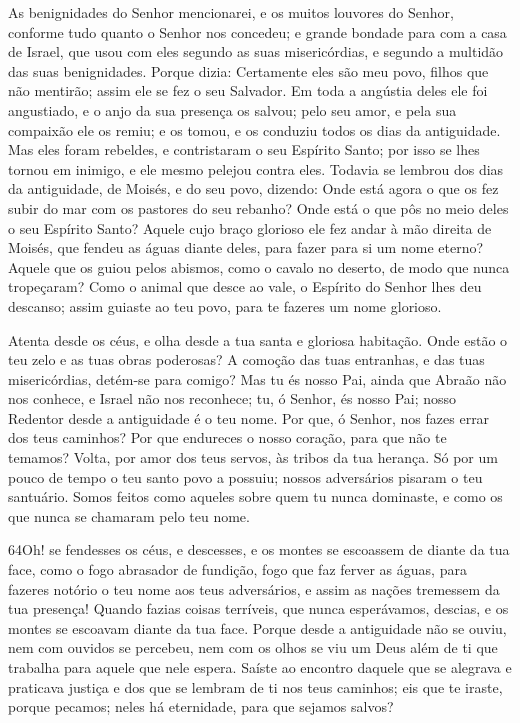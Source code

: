 As benignidades do Senhor mencionarei, e os muitos louvores do
Senhor, conforme tudo quanto o Senhor nos concedeu; e grande bondade
para com a casa de Israel, que usou com eles segundo as suas
misericórdias, e segundo a multidão das suas benignidades.
Porque dizia: Certamente eles são meu povo, filhos que não
mentirão; assim ele se fez o seu Salvador. Em toda a angústia
deles ele foi angustiado, e o anjo da sua presença os salvou; pelo
seu amor, e pela sua compaixão ele os remiu; e os tomou, e os
conduziu todos os dias da antiguidade. Mas eles foram
rebeldes, e contristaram o seu Espírito Santo; por isso se lhes
tornou em inimigo, e ele mesmo pelejou contra eles. Todavia
se lembrou dos dias da antiguidade, de Moisés, e do seu povo,
dizendo: Onde está agora o que os fez subir do mar com os pastores
do seu rebanho? Onde está o que pôs no meio deles o seu Espírito
Santo? Aquele cujo braço glorioso ele fez andar à mão direita
de Moisés, que fendeu as águas diante deles, para fazer para si um
nome eterno? Aquele que os guiou pelos abismos, como o cavalo
no deserto, de modo que nunca tropeçaram? Como o animal que
desce ao vale, o Espírito do Senhor lhes deu descanso; assim guiaste
ao teu povo, para te fazeres um nome glorioso.

Atenta desde os céus, e olha desde a tua santa e gloriosa
habitação. Onde estão o teu zelo e as tuas obras poderosas? A
comoção das tuas entranhas, e das tuas misericórdias, detém-se para
comigo? Mas tu és nosso Pai, ainda que Abraão não nos
conhece, e Israel não nos reconhece; tu, ó Senhor, és nosso Pai;
nosso Redentor desde a antiguidade é o teu nome. Por que, ó
Senhor, nos fazes errar dos teus caminhos? Por que endureces o nosso
coração, para que não te temamos? Volta, por amor dos teus servos,
às tribos da tua herança. Só por um pouco de tempo o teu
santo povo a possuiu; nossos adversários pisaram o teu santuário.
Somos feitos como aqueles sobre quem tu nunca dominaste, e
como os que nunca se chamaram pelo teu nome.

\medskip

\lettrine{64}{}Oh! se fendesses os céus, e descesses, e os
montes se escoassem de diante da tua face, como o fogo abrasador
de fundição, fogo que faz ferver as águas, para fazeres notório o
teu nome aos teus adversários, e assim as nações tremessem da tua
presença! Quando fazias coisas terríveis, que nunca esperávamos,
descias, e os montes se escoavam diante da tua face. Porque
desde a antiguidade não se ouviu, nem com ouvidos se percebeu, nem
com os olhos se viu um Deus além de ti que trabalha para aquele que
nele espera. Saíste ao encontro daquele que se alegrava e
praticava justiça e dos que se lembram de ti nos teus caminhos; eis
que te iraste, porque pecamos; neles há eternidade, para que sejamos
salvos?

